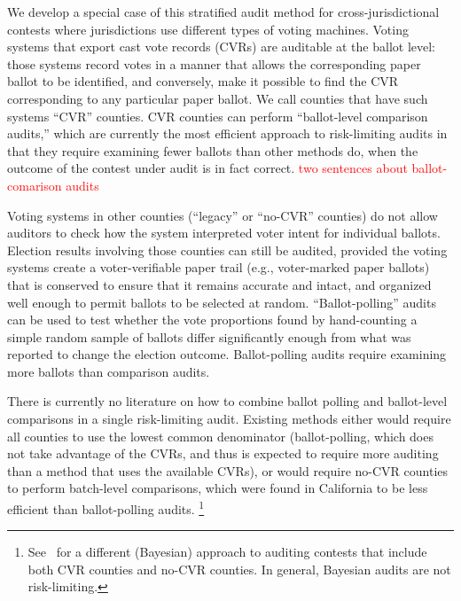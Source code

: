 \documentclass[runningheads]{llncs}
\newcommand{\comment}[1]{\textcolor{red}{\sc #1}}
\begin{document}
We develop a special case of this stratified audit method for cross-jurisdictional contests where 
jurisdictions use different types of voting machines.
Voting systems that export cast vote records (CVRs) are auditable at the ballot level: 
those systems record votes in a manner that allows the corresponding paper ballot to be identified,
and conversely, make it possible to find the CVR corresponding to any
particular paper ballot.
We call counties that have such systems ``CVR'' counties.
CVR counties can perform ``ballot-level comparison audits,'' \cite{lindemanStark12} 
which are currently the most efficient approach to risk-limiting audits in that they require examining fewer
ballots than other methods do, when the outcome of the contest under audit 
is in fact correct.
\comment{two sentences about ballot-comarison audits}

Voting systems in other counties (``legacy'' or ``no-CVR'' counties) 
do not allow auditors to check how the system interpreted voter intent for individual ballots.
Election results involving those counties can still be audited, provided the voting systems
create a voter-verifiable paper trail (e.g., voter-marked paper ballots) that is
conserved to ensure that it remains accurate and intact, and organized well enough
to permit ballots to be selected at random.
``Ballot-polling'' audits \cite{lindemanEtal12,lindemanStark12} can be used to test whether the vote proportions 
found by hand-counting a simple random sample of ballots differ significantly enough from what was reported
to change the election outcome. 
Ballot-polling audits require examining more ballots than comparison audits.

There is currently no literature on how to combine
ballot polling and ballot-level comparisons in a single risk-limiting audit.
Existing methods either would require all counties to use the lowest
common denominator (ballot-polling, which does not take advantage of the CVRs,
and thus is expected to require more auditing than a method that uses the available CVRs),
 or would require no-CVR counties to perform batch-level comparisons, which were found in
California to be less efficient than ballot-polling audits\cite{CA_SOS_EAC}.%
\footnote{%
  See~\cite{Rivest-2018-bayesian-tabulation-audits}
  for a different (Bayesian) approach to auditing contests that include both CVR counties
  and no-CVR counties. In general, Bayesian audits are not risk-limiting.
}
\end{document}
